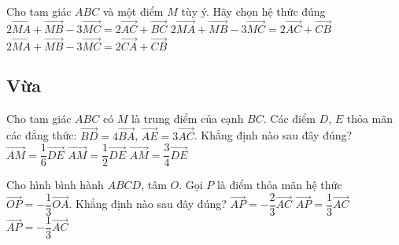 \begin{ex}%
	Cho tam giác $ABC$ và một điểm $M$ tùy ý. Hãy chọn hệ thức đúng
	{$2\vec{MA}+\vec{MB}-3\vec{MC}=2\vec{AC}+\vec{BC}$}
	{$2\vec{MA}+\vec{MB}-3\vec{MC}=2\vec{AC}+\vec{CB}$}
	{\True$2\vec{MA}+\vec{MB}-3\vec{MC}=2\vec{CA}+\vec{CB}$}
\end{ex}

\subsection*{Vừa}
\begin{ex}%
	Cho tam giác $ABC$ có $M$ là trung điểm của cạnh $BC$. Các điểm $D$, $E$ thỏa mãn các đẳng thức: $\vec{BD}=4\vec{BA}$, $\vec{AE}=3\vec{AC}$. Khẳng định nào sau đây đúng? 
	{\True$\vec{AM}=\dfrac{1}{6}\vec{DE}$}
	{$\vec{AM}=\dfrac{1}{2}\vec{DE}$}
	{$\vec{AM}=\dfrac{3}{4}\vec{DE}$}
\end{ex}

\begin{ex}%
	Cho hình bình hành $ABCD$, tâm $O$. Gọi $P$ là điểm thỏa mãn hệ thức $\vec{OP}=-\dfrac{1}{3}\vec{OA}$. Khẳng định nào sau đây đúng? 
	{$\vec{AP}=-\dfrac{2}{3}\vec{AC}$}
	{$\vec{AP}=\dfrac{1}{3}\vec{AC}$}
	{$\vec{AP}=-\dfrac{1}{3}\vec{AC}$}		
\end{ex}

